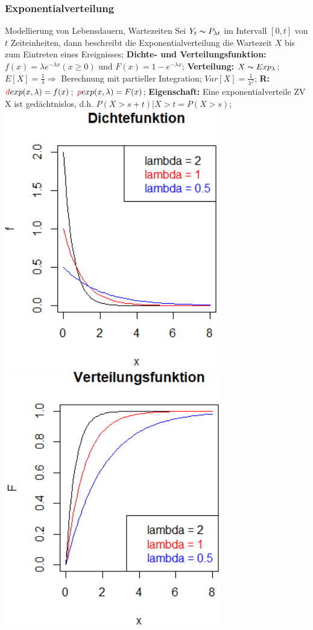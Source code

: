 \subsubsection{Exponentialverteilung}
Modellierung von Lebensdauern, Wartezeiten Sei $ Y_{t} \thicksim P_{\lambda t} $ im Intervall $ [0,t] $  von $ t $  Zeiteinheiten, dann beschreibt die Exponentialverteilung die Wartezeit $ X $ bis zum Eintreten eines Ereignisses; 
\textbf{Dichte- und Verteilungsfunktion:} 
$ f(x) = \lambda e^{-\lambda x} (x \ge 0) $ und 
$ F(x) = 1 - e^{-\lambda x}$; 
\textbf{Verteilung:} 
$ X \thicksim Exp_{\lambda}$; 
$ E[X] = \frac{1}{\lambda} \Rightarrow$ Berechnung mit partieller Integration; 
$ Var[X] = \frac{1}{\lambda^2}$;
\textbf{R:} 
$ \textcolor{red}{d}exp(x,\lambda) = f(x)$; 
$ \textcolor{red}{p}exp(x,\lambda) = F(x)$; 
\textbf{Eigenschaft:} 
Eine exponentialverteile ZV X ist gedächtnislos, d.h. 
$ P(X > s + t) | X > t = P( X > s)$; 
\includegraphics[scale=0.25]{./pic/ExponentialverteilungDichtefunktion.png}
\includegraphics[scale=0.25]{./pic/ExponentialverteilungVerteilungsfunktion.png}
